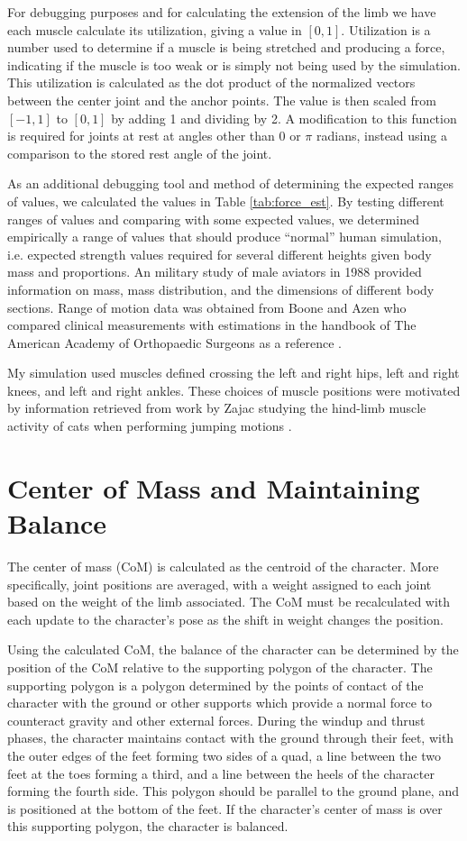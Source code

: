 For debugging purposes and for calculating the extension of the limb we have each muscle calculate its utilization, giving a value in $[0,1]$.  Utilization is a number used to determine if a muscle is being stretched and producing a force, indicating if the muscle is too weak or is simply not being used by the simulation.  This utilization is calculated as the dot product of the normalized vectors between the center joint and the anchor points.  The value is then scaled from $[-1, 1]$ to $[0,1]$ by adding 1 and dividing by 2.  A modification to this function is required for joints at rest at angles other than 0 or $\pi$ radians, instead using a comparison to the stored rest angle of the joint.

As an additional debugging tool and method of determining the expected ranges of values, we calculated the values in Table \ref{tab:force_est}.  By testing different ranges of values and comparing with some expected values, we determined empirically a range of values that should produce ``normal'' human simulation, i.e. expected strength values required for several different heights given body mass and proportions.  An military study of male aviators in 1988 provided information on mass, mass distribution, and the dimensions of different body sections.  Range of motion data was obtained from Boone and Azen who compared clinical measurements with estimations in the handbook of The American Academy of Orthopaedic Surgeons as a reference \cite{Boone756}.

My simulation used muscles defined crossing the left and right hips, left and right knees, and left and right ankles.  These choices of muscle positions were motivated by information retrieved from work by Zajac studying the hind-limb muscle activity of cats when performing jumping motions \cite{Zajac73, Zajac979}.

\section{Center of Mass and Maintaining Balance}
\label{section:com}
The center of mass (CoM) is calculated as the centroid of the character.  More specifically, joint positions are averaged, with a weight assigned to each joint based on the weight of the limb associated.  The CoM must be recalculated with each update to the character's pose as the shift in weight changes the position.

Using the calculated CoM, the balance of the character can be determined by the position of the CoM relative to the supporting polygon of the character.  The supporting polygon is a polygon determined by the points of contact of the character with the ground or other supports which provide a normal force to counteract gravity and other external forces.  During the windup and thrust phases, the character maintains contact with the ground through their feet, with the outer edges of the feet forming two sides of a quad, a line between the two feet at the toes forming a third, and a line between the heels of the character forming the fourth side.  This polygon should be parallel to the ground plane, and is positioned at the bottom of the feet.  If the character's center of mass is over this supporting polygon, the character is balanced.

